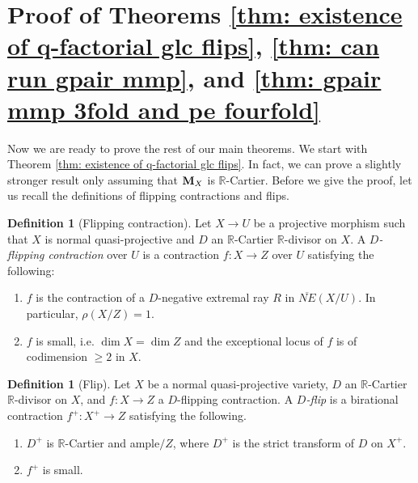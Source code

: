 \documentclass[11pt]{amsart}
\numberwithin{equation}{section}
\newcommand{\Mm}{{\bf{M}}}
\newcommand{\Rr}{\mathbb{R}}
\theoremstyle{definition}
\newtheorem{defn}[thm]{Definition}
\theoremstyle{definition}
\theoremstyle{definition}
\begin{document}
\section{Proof of Theorems \ref{thm: existence of q-factorial glc flips}, \ref{thm: can run gpair mmp}, and \ref{thm: gpair mmp 3fold and pe fourfold}}

Now we are ready to prove the rest of our main theorems. We start with Theorem \ref{thm: existence of q-factorial glc flips}. In fact, we can prove a slightly stronger result only assuming that $\Mm_X$ is $\Rr$-Cartier. Before we give the proof, let us recall the definitions of flipping contractions and flips.

\begin{defn}[Flipping contraction]\label{defn: flipping contraction}
Let $X\rightarrow U$ be a projective morphism such that $X$ is normal quasi-projective and $D$ an $\Rr$-Cartier $\Rr$-divisor on $X$. A \emph{$D$-flipping contraction} over $U$ is a contraction $f: X\rightarrow Z$ over $U$ satisfying the following:
\begin{enumerate}
    \item $f$ is the contraction of a $D$-negative extremal ray $R$ in $\overline{NE}(X/U)$. In particular, $\rho(X/Z)=1$.
    \item $f$ is small, i.e. $\dim X=\dim Z$ and the exceptional locus of $f$ is of codimension $\geq 2$ in $X$.
\end{enumerate}
\end{defn}

\begin{defn}[Flip]\label{defn: flip}
Let $X$ be a normal quasi-projective variety, $D$ an $\Rr$-Cartier $\Rr$-divisor on $X$, and $f: X\rightarrow Z$ a $D$-flipping contraction. A \emph{$D$-flip} is a birational contraction $f^+: X^+\rightarrow Z$ satisfying the following.
\begin{enumerate}
    \item $D^+$ is $\Rr$-Cartier and ample$/Z$, where $D^+$ is the strict transform of $D$ on $X^+$.
    \item $f^+$ is small.
\end{enumerate}
\end{defn}
\end{document}
